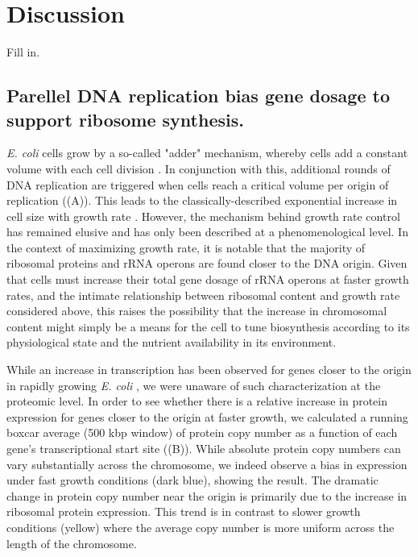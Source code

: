 \section{Discussion}

Fill in.

\subsection{Parellel DNA replication bias gene dosage to support ribosome synthesis.}

\textit{E. coli} cells grow by a so-called "adder" mechanism, whereby cells add
a constant volume with each cell division \citep{taheriaraghi2015}. In
conjunction with this, additional rounds of DNA replication are triggered when
cells reach a critical volume per origin of replication
((A)). This leads to the classically-described
exponential increase in cell size with growth rate \cite{schaechter1958, si2017,
si2019}. However, the mechanism behind growth rate control has remained elusive
and has only been described at a phenomenological level. In the context of
maximizing growth rate, it is notable that the majority of ribosomal proteins
and rRNA operons are found closer to the DNA origin. Given that cells must
increase their total gene dosage of rRNA operons at faster growth rates, and the
intimate relationship between ribosomal content and growth rate considered
above, this raises the possibility that the increase in chromosomal content
might simply be a means for the cell to tune biosynthesis according to its
physiological state and the nutrient availability in its environment.

While an increase in transcription has been observed for genes closer to the
origin in rapidly growing \textit{E. coli} \citep{scholz2019}, we were
unaware of such characterization at the proteomic level. In order to see
whether there is a relative increase in protein expression for genes closer
to the origin at faster growth, we calculated a running boxcar average (500
kbp window) of protein copy number as a function of each gene's
transcriptional start site ((B)). While absolute
protein copy numbers can vary substantially across the chromosome, we indeed
observe a bias in expression under fast growth conditions (dark blue), showing the
result. The dramatic change in protein copy number near the origin is primarily
due to the increase in ribosomal protein expression. This trend is in
contrast to slower growth conditions (yellow) where the average copy number is more
uniform across the length of the chromosome.

